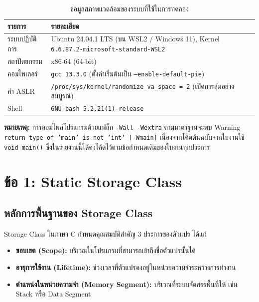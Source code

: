 \documentclass[a4paper,11pt]{article}
\newcommand{\code}[1]{\texttt{#1}}
\begin{document}
\begin{table}[H]
\centering\small
\caption{ข้อมูลสภาพแวดล้อมของระบบที่ใช้ในการทดลอง}
\begin{tabular}{@{}lp{12.4cm}@{}}
\toprule
\textbf{รายการ} & \textbf{รายละเอียด} \\
\midrule
ระบบปฏิบัติการ & Ubuntu 24.04.1 LTS (บน WSL2 / Windows 11), Kernel \code{6.6.87.2-microsoft-standard-WSL2} \\
สถาปัตยกรรม & x86-64 (64-bit) \\
คอมไพเลอร์ & \code{gcc 13.3.0} (ตั้งค่าเริ่มต้นเป็น \code{--enable-default-pie}) \\
ค่า ASLR & \code{/proc/sys/kernel/randomize\_va\_space = 2} (เปิดการสุ่มอย่างสมบูรณ์) \\
Shell & \code{GNU bash 5.2.21(1)-release} \\
\bottomrule
\end{tabular}
\end{table}

\textbf{หมายเหตุ:} การคอมไพล์โปรแกรมด้วยแฟล็ก \code{-Wall -Wextra} ตามมาตรฐานจะพบ Warning \code{return type of 'main' is not 'int' [-Wmain]} เนื่องจากโค้ดต้นฉบับจากใบงานใช้ \code{void main()} ซึ่งในรายงานนี้ได้คงโค้ดไว้ตามข้อกำหนดเดิมของใบงานทุกประการ

\section{ข้อ 1: Static Storage Class}

\subsection{หลักการพื้นฐานของ Storage Class}

Storage Class ในภาษา C กำหนดคุณสมบัติสำคัญ 3 ประการของตัวแปร ได้แก่
\begin{itemize}[leftmargin=*]
  \item \textbf{ขอบเขต (Scope):} บริเวณในโปรแกรมที่สามารถเข้าถึงชื่อตัวแปรนั้นได้
  \item \textbf{อายุการใช้งาน (Lifetime):} ช่วงเวลาที่ตัวแปรคงอยู่ในหน่วยความจำระหว่างการทำงาน
  \item \textbf{ตำแหน่งในหน่วยความจำ (Memory Segment):} บริเวณที่ระบบจัดสรรพื้นที่ให้ เช่น Stack หรือ Data Segment
\end{itemize}
\end{document}
